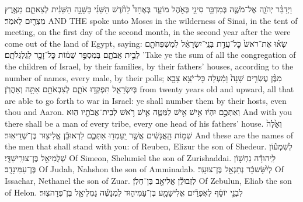 \documentclass[11pt, openany]{book}
\newcommand{\texttitle}{ספר  ויקרא}%
\begin{document}
	

	
\clearpage
\mainmatter

\fancyhead[C]{\texttitle \space\textendash\space \parshaname \space\textendash\space \englishfont \Roman{chap} Leviticus}
\setcounter{chap}{1}
\setcounter{verse}{1}
\setcounter{sedra}{1}


\setcounter{chap}{1}
\setcounter{verse}{1}
{וַיְדַבֵּ֨ר יְהֹוָ֧ה אֶל־מֹשֶׁ֛ה בְּמִדְבַּ֥ר סִינַ֖י בְּאֹ֣הֶל מוֹעֵ֑ד בְּאֶחָד֩ לַחֹ֨דֶשׁ הַשֵּׁנִ֜י בַּשָּׁנָ֣ה הַשֵּׁנִ֗ית לְצֵאתָ֛ם מֵאֶ֥רֶץ מִצְרַ֖יִם לֵאמֹֽר׃}
{AND THE \lord\space spoke unto Moses in the wilderness of Sinai, in the tent of meeting, on the first day of the second month, in the second year after the were come out of the land of Egypt, saying:}
{שְׂא֗וּ אֶת־רֹאשׁ֙ כׇּל־עֲדַ֣ת בְּנֵֽי־יִשְׂרָאֵ֔ל לְמִשְׁפְּחֹתָ֖ם לְבֵ֣ית אֲבֹתָ֑ם בְּמִסְפַּ֣ר שֵׁמ֔וֹת כׇּל־זָכָ֖ר לְגֻלְגְּלֹתָֽם׃}
{’Take ye the sum of all the congregation of the children of Israel, by their families, by their fathers’ houses, according to the number of names, every male, by their polls;}
{מִבֶּ֨ן עֶשְׂרִ֤ים שָׁנָה֙ וָמַ֔עְלָה כׇּל־יֹצֵ֥א צָבָ֖א בְּיִשְׂרָאֵ֑ל תִּפְקְד֥וּ אֹתָ֛ם לְצִבְאֹתָ֖ם אַתָּ֥ה וְאַהֲרֹֽן׃}
{from twenty years old and upward, all that are able to go forth to war in Israel: ye shall number them by their hosts, even thou and Aaron.}
{וְאִתְּכֶ֣ם יִהְי֔וּ אִ֥ישׁ אִ֖ישׁ לַמַּטֶּ֑ה אִ֛ישׁ רֹ֥אשׁ לְבֵית־אֲבֹתָ֖יו הֽוּא׃}
{And with you there shall be a man of every tribe, every one head of his fathers’ house.}
{וְאֵ֙לֶּה֙ שְׁמ֣וֹת הָֽאֲנָשִׁ֔ים אֲשֶׁ֥ר יַֽעַמְד֖וּ אִתְּכֶ֑ם לִרְאוּבֵ֕ן אֱלִיצ֖וּר בֶּן־שְׁדֵיאֽוּר׃}
{And these are the names of the men that shall stand with you: of Reuben, Elizur the son of Shedeur.}
{לְשִׁמְע֕וֹן שְׁלֻמִיאֵ֖ל בֶּן־צוּרִֽישַׁדָּֽי׃}
{Of Simeon, Shelumiel the son of Zurishaddai.}
{לִֽיהוּדָ֕ה נַחְשׁ֖וֹן בֶּן־עַמִּינָדָֽב׃}
{Of Judah, Nahshon the son of Amminadab.}
{לְיִ֨שָּׂשכָ֔ר נְתַנְאֵ֖ל בֶּן־צוּעָֽר׃}
{Of Issachar, Nethanel the son of Zuar.}
{לִזְבוּלֻ֕ן אֱלִיאָ֖ב בֶּן־חֵלֹֽן׃}
{Of Zebulun, Eliab the son of Helon.}
{לִבְנֵ֣י יוֹסֵ֔ף לְאֶפְרַ֕יִם אֱלִישָׁמָ֖ע בֶּן־עַמִּיה֑וּד לִמְנַשֶּׁ֕ה גַּמְלִיאֵ֖ל בֶּן־פְּדָהצֽוּר׃}
\end{document}
